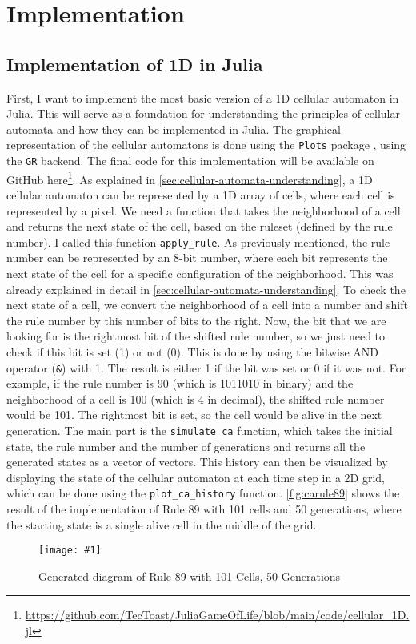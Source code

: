 \documentclass[a4paper,12pt]{llncs}
\numberwithin{equation}{section}
\newcommand{\imagewithwidth}[5]{
  \begin{figure}[htbp]%
    \begin{center}%
      \texttt{[image: \#1]}%
      \caption[#5]{#4}%
      \label{#3}%
    \end{center}%
  \end{figure}
}
\begin{document}
\section{Implementation}
\subsection{Implementation of 1D in Julia}
First, I want to implement the most basic version of a 1D cellular automaton in Julia.
This will serve as a foundation for understanding the principles of cellular automata and how they can be implemented in Julia.
The graphical representation of the cellular automatons is done using the \texttt{Plots} package \cite{JuliaPlots}, using the \texttt{GR} \cite{JuliaGR,GR} backend.
The final code for this implementation will be available on GitHub here\footnote{\url{https://github.com/TecToast/JuliaGameOfLife/blob/main/code/cellular_1D.jl}}.
As explained in \autoref{sec:cellular-automata-understanding}, a 1D cellular automaton can be represented by a 1D array of cells, where each cell is represented by a pixel.
We need a function that takes the neighborhood of a cell and returns the next state of the cell, based on the ruleset (defined by the rule number). I called this function \texttt{apply\_rule}.
As previously mentioned, the rule number can be represented by an 8-bit number, where each bit represents the next state of the cell for a specific configuration of the neighborhood.
This was already explained in detail in \autoref{sec:cellular-automata-understanding}.
To check the next state of a cell, we convert the neighborhood of a cell into a number and shift the rule number by this number of bits to the right. Now, the bit that we are looking for is the rightmost bit of the shifted rule number, so we just need to check if this bit is set (1) or not (0).
This is done by using the bitwise AND operator (\texttt{\&}) with 1. The result is either 1 if the bit was set or 0 if it was not.
For example, if the rule number is 90 (which is 1011010 in binary) and the neighborhood of a cell is 100 (which is 4 in decimal), the shifted rule number would be 101. The rightmost bit is set, so the cell would be alive in the next generation.
The main part is the \texttt{simulate\_ca} function, which takes the initial state, the rule number and the number of generations and returns all the generated states as a vector of vectors.
This history can then be visualized by displaying the state of the cellular automaton at each time step in a 2D grid, which can be done using the \texttt{plot\_ca\_history} function.
\autoref{fig:carule89} shows the result of the implementation of Rule 89 with 101 cells and 50 generations, where the starting state is a single alive cell in the middle of the grid.
\imagewithwidth{figures/carule89}{0.4\textwidth}{fig:carule89}{Generated diagram of Rule 89 with 101 Cells, 50 Generations}{}
\end{document}
